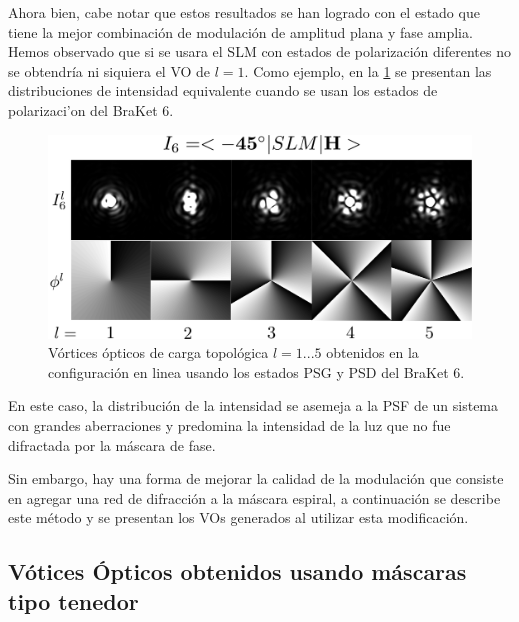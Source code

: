 Ahora bien, cabe notar que estos resultados se han logrado con el
estado que tiene la mejor combinación de modulación de amplitud plana
y fase amplia. Hemos observado que si se usara el SLM con estados de
polarización diferentes no se obtendría ni siquiera el VO de
$l=1$. Como ejemplo, en la \ref{fig:VOs_I6} se presentan las
distribuciones de intensidad equivalente cuando se usan los estados de
polarizaci'on del BraKet 6. 
\begin{figure}[h!]
\centering
\includegraphics[scale=0.4]{OV_I6.pdf}
\caption[Vórtices ópticos obtenidos en la configuración en linea para
el BraKet 6]{Vórtices ópticos de carga topológica $l=1...5$ obtenidos
  en la configuración en linea usando los estados PSG y PSD del BraKet 6.} 
\label{fig:VOs_I6}
\end{figure}
En este caso, la distribución de la intensidad se asemeja a la PSF de
un sistema con grandes aberraciones y predomina la intensidad de la
luz que no fue difractada por la máscara de fase. 

Sin embargo, hay una forma de mejorar la calidad de la modulación que
consiste en agregar una red de difracción a la máscara espiral, a
continuación se describe este método y se presentan los VOs generados
al utilizar esta modificación. 

\subsection{Vótices Ópticos obtenidos usando máscaras tipo tenedor}

